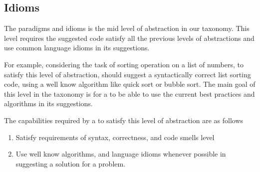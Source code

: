 \subsection{Idioms}
The paradigms and idioms is the mid level of abstraction in our taxonomy. This level requires the suggested code satisfy all the previous levels of abstractions and use common language idioms in its suggestions. 

For example, considering the task of sorting operation on a list of numbers, to satisfy this level of abstraction, \cct{} should suggest a syntactically correct list sorting code, using a well know algorithm like quick sort or bubble sort. The main goal of this level in the taxonomy is for a \cct{} to be able to use the current best practices and algorithms in its suggestions.

The capabilities required by a \cct{} to satisfy this level of abstraction are as follows
\begin{enumerate}
    \item Satisfy requirements of syntax, correctness, and code smells level
    \item Use well know algorithms, and language idioms whenever possible in suggesting a solution for a problem.
\end{enumerate}